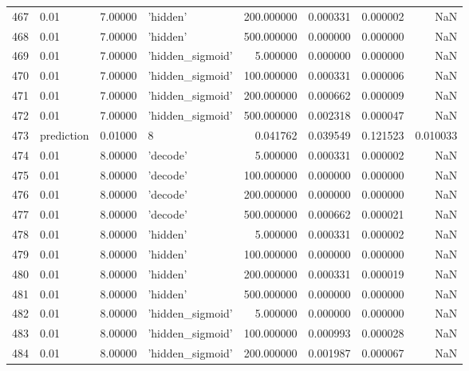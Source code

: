 \documentclass[10pt,a4paper]{article}
\begin{document}
\begin{tabular}{llrlrrrr}
467  &        0.01 &   7.00000 &           'hidden' &  200.000000 &  0.000331 &  0.000002 &       NaN \\
468  &        0.01 &   7.00000 &           'hidden' &  500.000000 &  0.000000 &  0.000000 &       NaN \\
469  &        0.01 &   7.00000 &   'hidden\_sigmoid' &    5.000000 &  0.000000 &  0.000000 &       NaN \\
470  &        0.01 &   7.00000 &   'hidden\_sigmoid' &  100.000000 &  0.000331 &  0.000006 &       NaN \\
471  &        0.01 &   7.00000 &   'hidden\_sigmoid' &  200.000000 &  0.000662 &  0.000009 &       NaN \\
472  &        0.01 &   7.00000 &   'hidden\_sigmoid' &  500.000000 &  0.002318 &  0.000047 &       NaN \\
473  &  prediction &   0.01000 &                  8 &    0.041762 &  0.039549 &  0.121523 &  0.010033 \\
474  &        0.01 &   8.00000 &           'decode' &    5.000000 &  0.000331 &  0.000002 &       NaN \\
475  &        0.01 &   8.00000 &           'decode' &  100.000000 &  0.000000 &  0.000000 &       NaN \\
476  &        0.01 &   8.00000 &           'decode' &  200.000000 &  0.000000 &  0.000000 &       NaN \\
477  &        0.01 &   8.00000 &           'decode' &  500.000000 &  0.000662 &  0.000021 &       NaN \\
478  &        0.01 &   8.00000 &           'hidden' &    5.000000 &  0.000331 &  0.000002 &       NaN \\
479  &        0.01 &   8.00000 &           'hidden' &  100.000000 &  0.000000 &  0.000000 &       NaN \\
480  &        0.01 &   8.00000 &           'hidden' &  200.000000 &  0.000331 &  0.000019 &       NaN \\
481  &        0.01 &   8.00000 &           'hidden' &  500.000000 &  0.000000 &  0.000000 &       NaN \\
482  &        0.01 &   8.00000 &   'hidden\_sigmoid' &    5.000000 &  0.000000 &  0.000000 &       NaN \\
483  &        0.01 &   8.00000 &   'hidden\_sigmoid' &  100.000000 &  0.000993 &  0.000028 &       NaN \\
484  &        0.01 &   8.00000 &   'hidden\_sigmoid' &  200.000000 &  0.001987 &  0.000067 &       NaN \\

\end{tabular}
\end{document}
